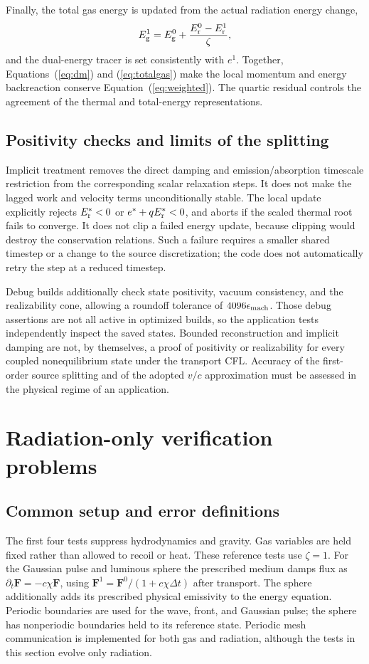 \documentclass[manuscript]{aastex7}
\newcommand{\vct}[1]{\boldsymbol{#1}}
\newcommand{\Er}{E_{\rm r}}
\newcommand{\Eg}{E_{\rm g}}
\newcommand{\Fr}{\vct{F}}
\newcommand{\dt}{\Delta t}
\newcommand{\eps}{\epsilon_{\rm mach}}
\begin{document}
Finally, the total gas energy is updated from the actual radiation
energy change,
\begin{equation}
 \Eg^1=\Eg^0+\frac{\Er^0-\Er^1}{\zeta},
 \label{eq:totalgas}
\end{equation}
and the dual-energy tracer is set consistently with $e^1$.
Together, Equations~(\ref{eq:dm}) and (\ref{eq:totalgas}) make the local
momentum and energy backreaction conserve Equation~(\ref{eq:weighted}).
The quartic residual controls the agreement of the thermal and
total-energy representations.

\subsection{Positivity checks and limits of the splitting}
Implicit treatment removes the direct damping and emission/absorption
timescale restriction from the corresponding scalar relaxation steps.
It does not make the lagged work and velocity terms unconditionally
stable. The local update explicitly rejects $\Er^*<0$ or
$e^*+q\Er^*<0$, and aborts if the scaled thermal root fails to converge.
It does not clip a failed energy update, because clipping would destroy
the conservation relations. Such a failure requires a smaller shared
timestep or a change to the source discretization; the code does not
automatically retry the step at a reduced timestep.

Debug builds additionally check state positivity, vacuum consistency,
and the realizability cone, allowing a roundoff tolerance of
$4096\eps$. Those debug assertions are not all active in optimized
builds, so the application tests independently inspect the saved states.
Bounded reconstruction and implicit damping are not, by themselves, a
proof of positivity or realizability for every coupled nonequilibrium
state under the transport CFL. Accuracy of the first-order source
splitting and of the adopted $v/c$ approximation must be assessed in
the physical regime of an application.

\section{Radiation-only verification problems}
\subsection{Common setup and error definitions}
The first four tests suppress hydrodynamics and gravity. Gas variables
are held fixed rather than allowed to recoil or heat. These reference
tests use $\zeta=1$. For the Gaussian
pulse and luminous sphere the prescribed medium damps flux as
$\partial_t\Fr=-c\chi\Fr$, using
$\Fr^1=\Fr^0/(1+c\chi\dt)$ after transport. The sphere additionally
adds its prescribed physical emissivity to the energy equation.
Periodic boundaries are used for the wave, front, and Gaussian pulse;
the sphere has nonperiodic boundaries held to its reference state.
Periodic mesh communication is implemented for both gas and radiation,
although the tests in this section evolve only radiation.
\end{document}
